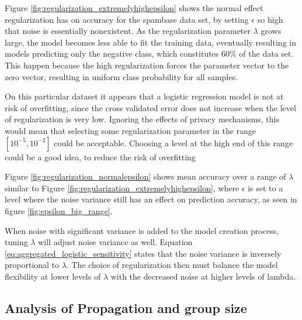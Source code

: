 Figure \ref{fig:regularization_extremelyhighepsilon} shows the normal effect regularization has on accuracy for the spambase data set, by setting $\epsilon$ so high that noise is essentially nonexistent. As the regularization parameter $\lambda$ grows large, the model becomes less able to fit the training data, eventually resulting in models predicting only the negative class, which constitutes 60\% of the data set. This happen because the high regularization forces the parameter vector to the zero vector, resulting in uniform class probability for all samples. 

On this particular dataset it appears that a logistic regression model is not at risk of overfitting, since the cross validated error does not increase when the level of regularization is very low. Ignoring the effects of privacy mechanisms, this would mean that selecting some regularization parameter in the range $[10^{-5},10^{-2}]$ could be acceptable. Choosing a level at the high end of this range could be a good idea, to reduce the risk of overfitting

Figure \ref{fig:regularization_normalepsilon} shows mean accuracy over a range of $\lambda$ similar to Figure \ref{fig:regularization_extremelyhighepsilon}, where $\epsilon$ is set to a level where the noise variance still has an effect on prediction accuracy, as seen in figure \ref{fig:epsilon_big_range}.

When noise with significant variance is added to the model creation process, tuning $\lambda$ will adjust noise variance as well. Equation \ref{eq:aggregated_logistic_sensitivity} states that the noise variance is inversely proportional to $\lambda$. The choice of regularization then must balance the model flexibility at lower levels of $\lambda$ with the decreased noise at higher levels of lambda.


\subsection{Analysis of Propagation and group size}



